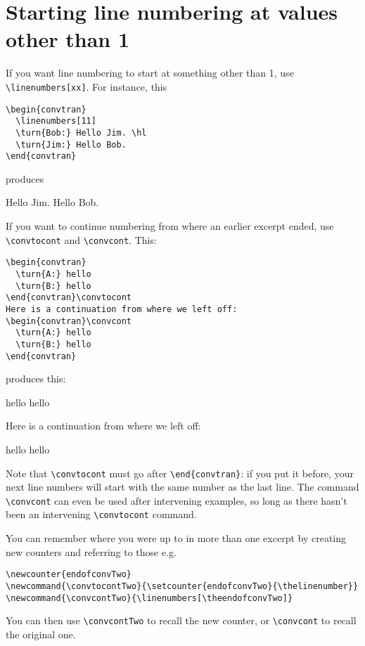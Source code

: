 \documentclass[a4paper]{article}
\begin{document}
\section{Starting line numbering at values other than 1}

If you want line numbering to start at something other than 1, use
\verb!\linenumbers[xx]!.  For instance, this
\begin{verbatim}
\begin{convtran}
  \linenumbers[11]
  \turn{Bob:} Hello Jim. \hl
  \turn{Jim:} Hello Bob.
\end{convtran}
\end{verbatim}
produces
\begin{convtran}
  \linenumbers[11]
   Hello Jim. \hl
   Hello Bob.
\end{convtran}

If you want to continue numbering from where an earlier excerpt ended,
use \verb!\convtocont! and \verb!\convcont!.  This:
\begin{verbatim}
\begin{convtran}
  \turn{A:} hello
  \turn{B:} hello
\end{convtran}\convtocont
Here is a continuation from where we left off:
\begin{convtran}\convcont
  \turn{A:} hello
  \turn{B:} hello
\end{convtran}
\end{verbatim}
produces this:
\begin{convtran}
   hello
   hello
\end{convtran}\convtocont
Here is a continuation from where we left off:
\begin{convtran}\convcont
   hello
   hello
\end{convtran}
Note that \verb!\convtocont! must go after \verb!\end{convtran}!: if
you put it before, your next line numbers will start with the same
number as the last line. The command \verb!\convcont! can even be used
after intervening examples, so long as there hasn't been an
intervening \verb!\convtocont! command.

You can remember where you were up to in more than one excerpt by
creating new counters and referring to those e.g. 
\begin{verbatim}
\newcounter{endofconvTwo}
\newcommand{\convtocontTwo}{\setcounter{endofconvTwo}{\thelinenumber}}
\newcommand{\convcontTwo}{\linenumbers[\theendofconvTwo]}
\end{verbatim}
You can then use \verb!\convcontTwo! to recall the new counter, or
\verb!\convcont! to recall the original one.
\end{document}
